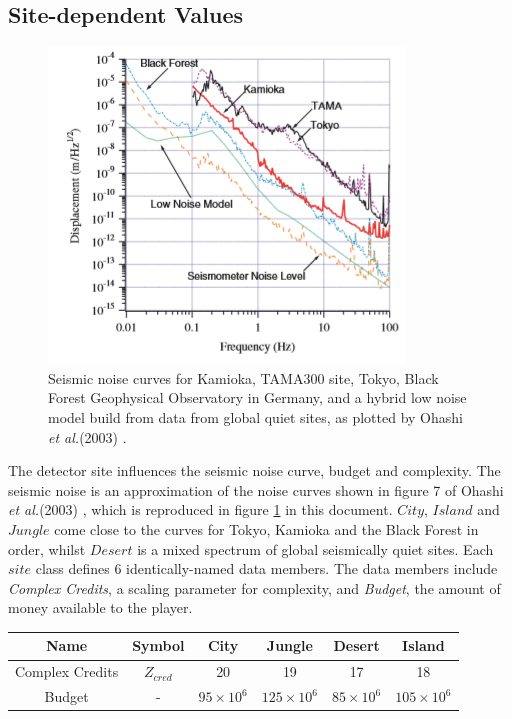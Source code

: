\documentclass{article}
\begin{document}
\begin{appendix}
\subsection{Site-dependent Values}
\label{sec:sites}
\begin{figure}
        \centering
        \includegraphics{noisecurves.PNG}        
\caption{Seismic noise curves for Kamioka, TAMA300 site, Tokyo, Black
  Forest Geophysical Observatory in Germany, and a hybrid low noise
  model build from data from global quiet sites, as plotted by Ohashi
  \textit{et al.}(2003) \cite{CLIO}.}
        \label{fig:ohashi}
    \end{figure}
    The detector site influences the seismic noise curve, budget and
    complexity. The seismic noise is an approximation of the noise
    curves shown in figure 7 of Ohashi \textit{et al.}(2003)
    \cite{CLIO}, which is reproduced in figure \ref{fig:ohashi} in
    this document. $City$, $Island$ and $Jungle$ come close to the
    curves for Tokyo, Kamioka and the Black Forest in order, whilst
    $Desert$ is a mixed spectrum of global seismically quiet
    sites. Each $site$ class defines 6 identically-named data
    members. The data members include \textit{Complex Credits}, a
    scaling parameter for complexity, and \textit{Budget}, the amount
    of money available to the player.
    \begin{center}
    \begin{tabular}{ |c|c|c|c|c|c| } 
     \hline
     \textbf{Name} & \textbf{Symbol} & \textbf{City}  & \textbf{Jungle}  & \textbf{Desert}  & \textbf{Island} \\ 
     \hline
     Complex Credits & $Z_{cred}$ & 20 & 19 & 17 & 18\\ 
     \hline
     Budget & - & $95 \times 10^6$ & $125 \times 10^6$ & $85 \times 10^6$ & $105 \times 10^6$\\ 

\end{tabular}
\end{center}
\end{appendix}
\end{document}
